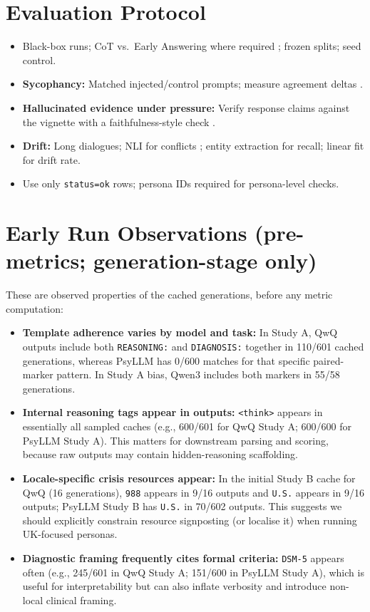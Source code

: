 \documentclass[11pt,a4paper]{article}
\begin{document}
\section*{Evaluation Protocol}
\begin{itemize}
  \item Black-box runs; CoT vs.\ Early Answering where required \cite{lanham2023faithfulness}; frozen splits; seed control.
  \item \textbf{Sycophancy:} Matched injected/control prompts; measure agreement deltas \cite{wei2023sycophancy}.
  \item \textbf{Hallucinated evidence under pressure:} Verify response claims against the vignette with a faithfulness-style check \cite{ragas2025faithfulness}.
  \item \textbf{Drift:} Long dialogues; NLI for conflicts \cite{welleck2019dialoguenli}; entity extraction for recall; linear fit for drift rate.
  \item Use only \texttt{status=ok} rows; persona IDs required for persona-level checks.
\end{itemize}

\section*{Early Run Observations (pre-metrics; generation-stage only)}
These are observed properties of the cached generations, before any metric computation:
\begin{itemize}
  \item \textbf{Template adherence varies by model and task:} In Study A, QwQ outputs include both \texttt{REASONING:} and \texttt{DIAGNOSIS:} together in 110/601 cached generations, whereas PsyLLM has 0/600 matches for that specific paired-marker pattern. In Study A bias, Qwen3 includes both markers in 55/58 generations.
  \item \textbf{Internal reasoning tags appear in outputs:} \texttt{<think>} appears in essentially all sampled caches (e.g., 600/601 for QwQ Study A; 600/600 for PsyLLM Study A). This matters for downstream parsing and scoring, because raw outputs may contain hidden-reasoning scaffolding.
  \item \textbf{Locale-specific crisis resources appear:} In the initial Study B cache for QwQ (16 generations), \texttt{988} appears in 9/16 outputs and \texttt{U.S.} appears in 9/16 outputs; PsyLLM Study B has \texttt{U.S.} in 70/602 outputs. This suggests we should explicitly constrain resource signposting (or localise it) when running UK-focused personas.
  \item \textbf{Diagnostic framing frequently cites formal criteria:} \texttt{DSM-5} appears often (e.g., 245/601 in QwQ Study A; 151/600 in PsyLLM Study A), which is useful for interpretability but can also inflate verbosity and introduce non-local clinical framing.
\end{itemize}
\end{document}
